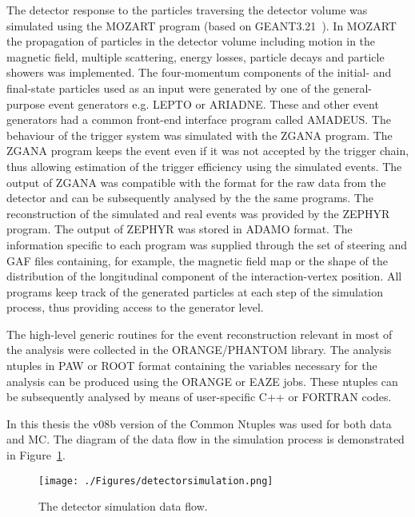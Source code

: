 The detector response to the particles traversing the detector volume was simulated using the MOZART program (based on GEANT3.21~\cite{tech:cern-dd-ee-84-1}). In MOZART the propagation of particles in the detector volume including motion in the magnetic field, multiple scattering, energy losses, particle decays and particle showers was implemented. The four-momentum components of the initial- and final-state particles used as an input were generated by one of the general-purpose event generators e.g. LEPTO or ARIADNE. These and other event generators had a common front-end interface program called AMADEUS. The behaviour of the trigger system was simulated with the ZGANA program. The ZGANA program keeps the event even if it was not accepted by the trigger chain, thus allowing estimation of the trigger efficiency using the simulated events. The output of ZGANA was compatible with the format for the raw data from the detector and can be subsequently analysed by the the same programs. The reconstruction of the simulated and real events was provided by the ZEPHYR program. The output of ZEPHYR was stored in ADAMO format. The information specific to each program was supplied through the set of steering and GAF files containing, for example, the magnetic field map or the shape of the distribution of the longitudinal component of the interaction-vertex position. All programs keep track of the generated particles at each step of the simulation process, thus providing access to the generator level.

The high-level generic routines for the event reconstruction relevant in most of the analysis were collected in the ORANGE/PHANTOM library. The analysis ntuples in PAW or ROOT format containing the variables necessary for the analysis can be produced using the ORANGE or EAZE jobs. These ntuples can be subsequently analysed by means of user-specific C++ or FORTRAN codes. 

In this thesis the v08b version of the Common Ntuples was used for both data and MC. The diagram of the data flow in the simulation process is demonstrated in Figure~\ref{fig:detectorsimulation}.

\begin{figure}[p]
	\centering
		\texttt{[image: ./Figures/detectorsimulation.png]}
	\caption{The \zeus detector simulation data flow.}
	\label{fig:detectorsimulation}
\end{figure}
